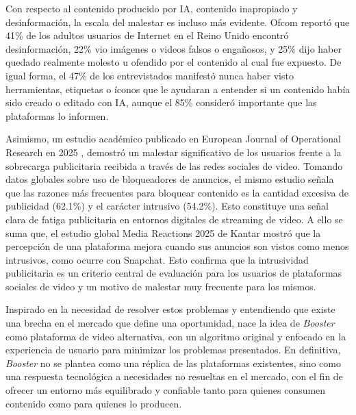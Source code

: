Con respecto al contenido producido por IA, contenido inapropiado y desinformación, la escala del malestar es incluso más evidente. Ofcom  \cite{ofcom_online_nations_2025} reportó que 41\% de los adultos usuarios de Internet en el Reino Unido encontró desinformación, 22\% vio imágenes o videos falsos o engañosos, y 25\% dijo haber quedado realmente molesto u ofendido por el contenido al cual fue expuesto. De igual forma, el 47\% de los entrevistados manifestó nunca haber visto herramientas, etiquetas o íconos que le ayudaran a entender si un contenido había sido creado o editado con IA, aunque el 85\% consideró importante que las plataformas lo informen.  %

Asimismo, un estudio académico publicado en European Journal of Operational Research en 2025 \cite{lu2025adblockers},  demostró un malestar significativo de los usuarios frente a la sobrecarga publicitaria recibida a través de las redes sociales de video. Tomando datos globales sobre uso de bloqueadores de anuncios, el mismo estudio señala que las razones más frecuentes para bloquear contenido es la cantidad excesiva de publicidad (62.1\%) y el carácter intrusivo (54.2\%). Esto constituye una señal clara de fatiga publicitaria en entornos digitales de streaming de video. A ello se suma que, el estudio global Media Reactions 2025 de Kantar mostró que la percepción de una plataforma mejora cuando sus anuncios son vistos como menos intrusivos, como ocurre con Snapchat. Esto confirma que la intrusividad publicitaria es un criterio central de evaluación para los usuarios de plataformas sociales de video y un motivo de malestar muy frecuente para los mismos.  %

Inspirado en la necesidad de resolver estos problemas y entendiendo que existe una brecha en el mercado que define una oportunidad, nace la idea de \textit{Booster} como plataforma de video alternativa, con un algoritmo original y enfocado en la experiencia de usuario para minimizar los problemas presentados. En definitiva, \textit{Booster} no se plantea como una réplica de las plataformas existentes, sino como una respuesta tecnológica a necesidades no resueltas en el mercado, con el fin de ofrecer un entorno más equilibrado y confiable tanto para quienes consumen contenido como para quienes lo producen.


